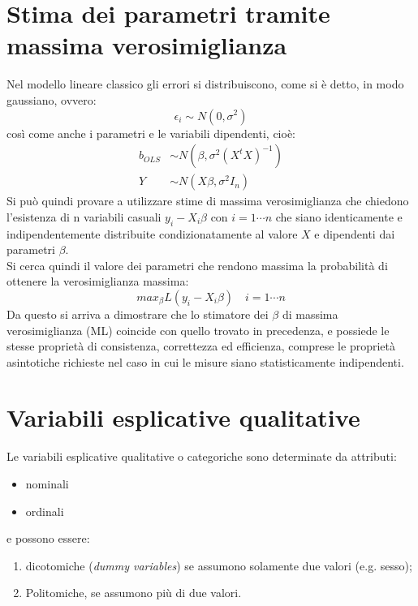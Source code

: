 \section{Stima dei parametri tramite massima verosimiglianza}
Nel modello lineare classico gli errori si distribuiscono, come si è detto, in modo gaussiano, ovvero:
\begin{equation}
\epsilon_i \sim N(0,\sigma^2)
\end{equation}
così come anche i parametri e le variabili dipendenti, cioè:
\begin{equation}
\begin{split}
b_{OLS} &\sim N(\beta, \sigma^2(X^tX)^{-1}) \\
Y &\sim N(X\beta, \sigma^2 I_n)
\end{split}
\end{equation}
Si può quindi provare a utilizzare stime di massima verosimiglianza che chiedono l'esistenza di n variabili casuali $y_i - X_i\beta$ con $i=1 \cdots n$ che siano identicamente e indipendentemente distribuite condizionatamente al valore $X$ e dipendenti dai parametri $\beta$.\\
Si cerca quindi il valore dei parametri che rendono massima la probabilità di ottenere la verosimiglianza massima:
\begin{equation}
max_\beta L(y_i - X_i\beta) \quad i=1 \cdots n
\end{equation}
Da questo si arriva a dimostrare che lo stimatore dei $\beta$ di massima verosimiglianza (ML) coincide con quello trovato in precedenza, e possiede le stesse proprietà di consistenza, correttezza ed efficienza, comprese le proprietà asintotiche richieste nel caso in cui le misure siano statisticamente indipendenti.

\section{Variabili esplicative qualitative}
Le variabili esplicative qualitative o categoriche sono determinate da attributi:
\begin{itemize}
	\item nominali
	\item ordinali
\end{itemize}
e possono essere:
\begin{enumerate}
	\item dicotomiche (\textit{dummy variables}) se assumono solamente due valori (e.g. sesso);
	\item Politomiche, se assumono più di due valori.
\end{enumerate}

